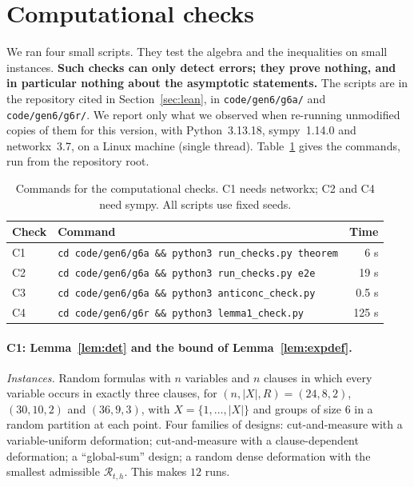 \documentclass[11pt,a4paper]{article}
\theoremstyle{definition}
\theoremstyle{remark}
\newcommand{\cR}{\mathcal{R}}
\begin{document}
\section{Computational checks}\label{sec:checks}

We ran four small scripts. They test the algebra and the inequalities on small instances.
\textbf{Such checks can only detect errors; they prove nothing, and in particular nothing
about the asymptotic statements.} The scripts are in the repository cited in
Section~\ref{sec:lean}, in \texttt{code/gen6/g6a/} and \texttt{code/gen6/g6r/}. We report
only what we observed when re-running unmodified copies of them for this version, with
Python~3.13.18, sympy~1.14.0 and networkx~3.7, on a Linux machine (single thread).
Table~\ref{tab:checks} gives the commands, run from the repository root.

\begin{table}[htbp]
\centering
\small
\begin{tabular}{@{}llr@{}}
\toprule
Check & Command & Time\\
\midrule
C1 & \texttt{cd code/gen6/g6a \&\& python3 run\_checks.py theorem} & 6 s\\
C2 & \texttt{cd code/gen6/g6a \&\& python3 run\_checks.py e2e} & 19 s\\
C3 & \texttt{cd code/gen6/g6a \&\& python3 anticonc\_check.py} & 0.5 s\\
C4 & \texttt{cd code/gen6/g6r \&\& python3 lemma1\_check.py} & 125 s\\
\bottomrule
\end{tabular}
\caption{Commands for the computational checks. C1 needs networkx; C2 and C4 need
sympy. All scripts use fixed seeds.}\label{tab:checks}
\end{table}

\paragraph{C1: Lemma~\ref{lem:det} and the bound of Lemma~\ref{lem:expdef}.}
\emph{Instances.} Random formulas with $n$ variables and $n$ clauses in which every variable
occurs in exactly three clauses, for $(n,|X|,R)=(24,8,2)$, $(30,10,2)$ and $(36,9,3)$, with
$X=\{1,\dots,|X|\}$ and groups of size $6$ in a random partition at each point. Four families
of designs: cut-and-measure with a variable-uniform deformation; cut-and-measure with a
clause-dependent deformation; a ``global-sum'' design; a random dense deformation with the
smallest admissible $\cR_{t,h}$. This makes $12$ runs.
\end{document}
